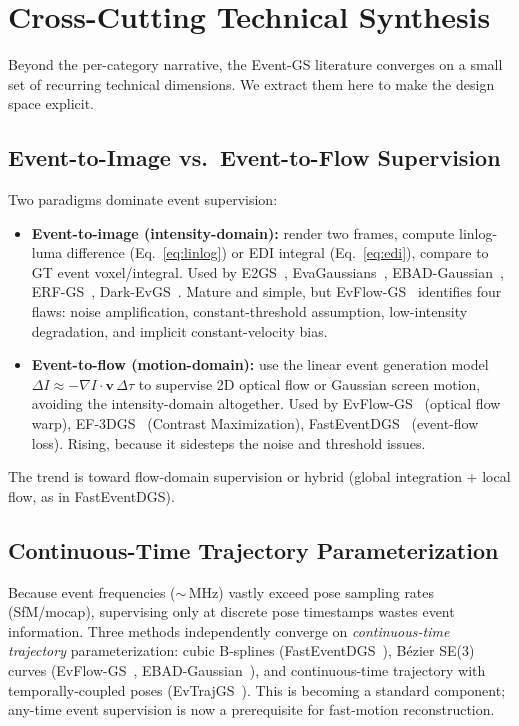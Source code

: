 \section{Cross-Cutting Technical Synthesis}
\label{sec:crosscutting}

Beyond the per-category narrative, the Event-GS literature converges on a small set of recurring technical dimensions. We extract them here to make the design space explicit.

\subsection{Event-to-Image vs.\ Event-to-Flow Supervision}
\label{sec:cross:supervision}

Two paradigms dominate event supervision:
\begin{itemize}
    \item \textbf{Event-to-image (intensity-domain):} render two frames, compute linlog-luma difference (Eq.~\eqref{eq:linlog}) or EDI integral (Eq.~\eqref{eq:edi}), compare to GT event voxel/integral. Used by E2GS~\cite{deguchi2024e2gs}, EvaGaussians~\cite{yu2025evagaussians}, EBAD-Gaussian~\cite{deng2025ebad}, ERF-GS~\cite{bai2026erfgs}, Dark-EvGS~\cite{wu2025darkevgs}. Mature and simple, but EvFlow-GS~\cite{an2026evflow} identifies four flaws: noise amplification, constant-threshold assumption, low-intensity degradation, and implicit constant-velocity bias.
    \item \textbf{Event-to-flow (motion-domain):} use the linear event generation model $\Delta I\approx-\nabla I\cdot\mathbf{v}\,\Delta\tau$ to supervise 2D optical flow or Gaussian screen motion, avoiding the intensity-domain altogether. Used by EvFlow-GS~\cite{an2026evflow} (optical flow warp), EF-3DGS~\cite{liao2025ef3dgs} (Contrast Maximization), FastEventDGS~\cite{dai2026fasteventdgs} (event-flow loss). Rising, because it sidesteps the noise and threshold issues.
\end{itemize}
The trend is toward flow-domain supervision or hybrid (global integration + local flow, as in FastEventDGS).

\subsection{Continuous-Time Trajectory Parameterization}
\label{sec:cross:trajectory}

Because event frequencies ($\sim$\,MHz) vastly exceed pose sampling rates (SfM/mocap), supervising only at discrete pose timestamps wastes event information. Three methods independently converge on \emph{continuous-time trajectory} parameterization: cubic B-splines (FastEventDGS~\cite{dai2026fasteventdgs}), B\'ezier SE(3) curves (EvFlow-GS~\cite{an2026evflow}, EBAD-Gaussian~\cite{deng2025ebad}), and continuous-time trajectory with temporally-coupled poses (EvTrajGS~\cite{chen2026evtrajgs}). This is becoming a standard component; any-time event supervision is now a prerequisite for fast-motion reconstruction.

